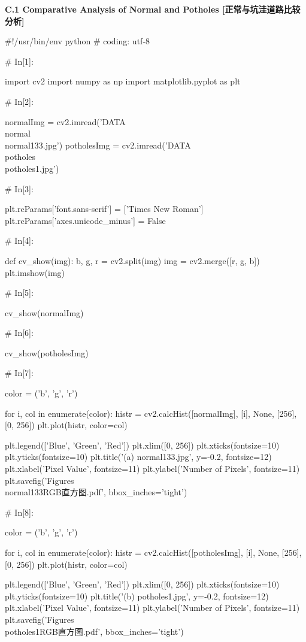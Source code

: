 \documentclass{MathorCupmodeling}
\begin{document}
\textbf{C.1 Comparative Analysis of Normal and Potholes [正常与坑洼道路比较分析]}
\begin{python}
#!/usr/bin/env python
# coding: utf-8

# In[1]:


import cv2
import numpy as np
import matplotlib.pyplot as plt

# In[2]:


normalImg = cv2.imread('DATA\\normal\\normal133.jpg')
potholesImg = cv2.imread('DATA\\potholes\\potholes1.jpg')

# In[3]:


plt.rcParams['font.sans-serif'] = ['Times New Roman']
plt.rcParams['axes.unicode_minus'] = False


# In[4]:


def cv_show(img):
    b, g, r = cv2.split(img)
    img = cv2.merge([r, g, b])
    plt.imshow(img)


# In[5]:


cv_show(normalImg)

# In[6]:


cv_show(potholesImg)

# In[7]:


color = ('b', 'g', 'r')

for i, col in enumerate(color):
    histr = cv2.calcHist([normalImg], [i], None, [256], [0, 256])
    plt.plot(histr, color=col)

plt.legend(['Blue', 'Green', 'Red'])
plt.xlim([0, 256])
plt.xticks(fontsize=10)
plt.yticks(fontsize=10)
plt.title('(a) normal133.jpg', y=-0.2, fontsize=12)
plt.xlabel('Pixel Value', fontsize=11)
plt.ylabel('Number of Pixels', fontsize=11)
plt.savefig('Figures\\normal133RGB直方图.pdf', bbox_inches='tight')

# In[8]:


color = ('b', 'g', 'r')

for i, col in enumerate(color):
    histr = cv2.calcHist([potholesImg], [i], None, [256], [0, 256])
    plt.plot(histr, color=col)

plt.legend(['Blue', 'Green', 'Red'])
plt.xlim([0, 256])
plt.xticks(fontsize=10)
plt.yticks(fontsize=10)
plt.title('(b) potholes1.jpg', y=-0.2, fontsize=12)
plt.xlabel('Pixel Value', fontsize=11)
plt.ylabel('Number of Pixels', fontsize=11)
plt.savefig('Figures\\potholes1RGB直方图.pdf', bbox_inches='tight')


\end{python}
\end{document}
